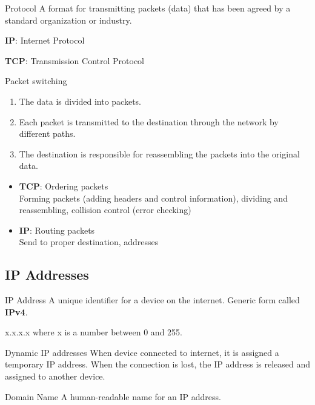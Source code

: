 \begin{definition}
    {Protocol}
    A format for transmitting packets (data) that has been agreed by a standard organization or industry.

    \textbf{IP}: Internet Protocol

    \textbf{TCP}: Transmission Control Protocol
\end{definition}

\begin{theorem}
    {Packet switching}
    \begin{enumerate}
        \item The data is divided into packets.
        \item Each packet is transmitted to the destination through the network by different paths.
        \item The destination is responsible for reassembling the packets into the original data.
    \end{enumerate}
    \begin{itemize}
        \item \textbf{TCP}: Ordering packets\\
              Forming packets (adding headers and control information), dividing and reassembling, collision control (error checking)
        \item \textbf{IP}: Routing packets\\
              Send to proper destination, addresses
    \end{itemize}
\end{theorem}

\subsection{IP Addresses}

\begin{definition}
    {IP Address}
    A unique identifier for a device on the internet. Generic form called \textbf{IPv4}.

    x.x.x.x where x is a number between 0 and 255.
\end{definition}

\begin{theorem}
    {Dynamic IP addresses}
    When device connected to internet, it is assigned a temporary IP address. When the connection is lost, the IP address is released and assigned to another device.
\end{theorem}

\begin{definition}
    {Domain Name}
    A human-readable name for an IP address.
\end{definition}

